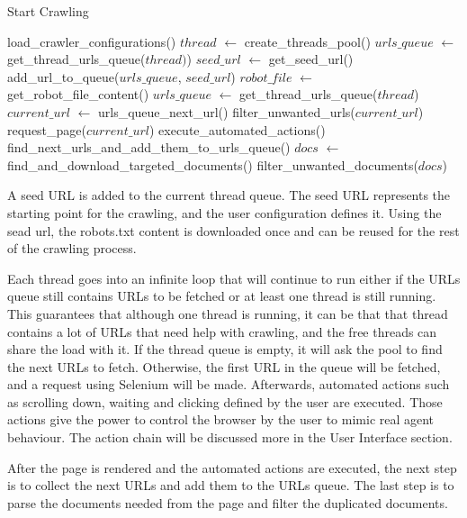 \begin{algorithm}[H]
	\caption{Start Crawling}\label{alg:alg1}
	\begin{algorithmic}[1]
		\State load\_crawler\_configurations()
		\State $thread$ $\gets$ create\_threads\_pool()
	    \State $urls\_queue$ $\gets$ get\_thread\_urls\_queue($thread)$)
	    \State $seed\_url$ $\gets$ get\_seed\_url()
	    \State add\_url\_to\_queue($urls\_queue$, $seed\_url$)
	    \State $robot\_file$ $\gets$ get\_robot\_file\_content()
		    \State $urls\_queue$ $\gets$ get\_thread\_urls\_queue($thread$)
		\Else
			\State $current\_url$ $\gets$ urls\_queue\_next\_url()
			\State filter\_unwanted\_urls($current\_url$)
			\State request\_page($current\_url$)
            \State execute\_automated\_actions()
			\State find\_next\_urls\_and\_add\_them\_to\_urls\_queue()
			\State $docs$ $\gets$ find\_and\_download\_targeted\_documents()
			\State filter\_unwanted\_documents($docs$)
		\EndIf
		\EndWhile

	\end{algorithmic}
\end{algorithm}


A seed URL is added to the current thread queue. The seed URL represents the starting point for the crawling, and the user configuration defines it. Using the sead url, the robots.txt content is downloaded once and can be reused for the rest of the crawling process.    

Each thread goes into an infinite loop that will continue to run either if the URLs queue still contains URLs to be fetched or at least one thread is still running. This guarantees that although one thread is running, it can be that that thread contains a lot of URLs that need help with crawling, and the free threads can share the load with it. If the thread queue is empty, it will ask the pool to find the next URLs to fetch. Otherwise, the first URL in the queue will be fetched, and a request using Selenium will be made. Afterwards, automated actions such as scrolling down, waiting and clicking defined by the user are executed. Those actions give the power to control the browser by the user to mimic real agent behaviour. The action chain will be discussed more in the User Interface section.  

After the page is rendered and the automated actions are executed, the next step is to collect the next URLs and add them to the URLs queue. The last step is to parse the documents needed from the page and filter the duplicated documents. 

